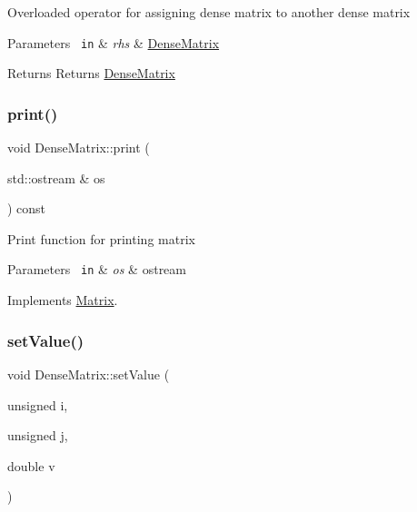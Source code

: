Overloaded operator for assigning dense matrix to another dense matrix 
\begin{DoxyParams}[1]{Parameters}
\mbox{\texttt{ in}}  & {\em rhs} & \mbox{\hyperlink{class_dense_matrix}{Dense\+Matrix}} \\
\hline
\end{DoxyParams}
\begin{DoxyReturn}{Returns}
Returns \mbox{\hyperlink{class_dense_matrix}{Dense\+Matrix}} 
\end{DoxyReturn}
\mbox{\label{class_dense_matrix_a0bfe50e5f3555d507a50ec52fc15dfa8}} 
\subsubsection{\texorpdfstring{print()}{print()}}
{\footnotesize\ttfamily void Dense\+Matrix\+::print (\begin{DoxyParamCaption}\item[{std\+::ostream \&}]{os }\end{DoxyParamCaption}) const\hspace{0.3cm}{\ttfamily [virtual]}}

Print function for printing matrix 
\begin{DoxyParams}[1]{Parameters}
\mbox{\texttt{ in}}  & {\em os} & ostream \\
\hline
\end{DoxyParams}


Implements \mbox{\hyperlink{class_matrix_a0003db86d2ce908119e082b9c35a4fb3}{Matrix}}.

\mbox{\label{class_dense_matrix_a64bf2553677cd22aba4a3811d5d5b6f8}} 
\subsubsection{\texorpdfstring{setValue()}{setValue()}}
{\footnotesize\ttfamily void Dense\+Matrix\+::set\+Value (\begin{DoxyParamCaption}\item[{unsigned}]{i,  }\item[{unsigned}]{j,  }\item[{double}]{v }\end{DoxyParamCaption})\hspace{0.3cm}{\ttfamily [virtual]}}

